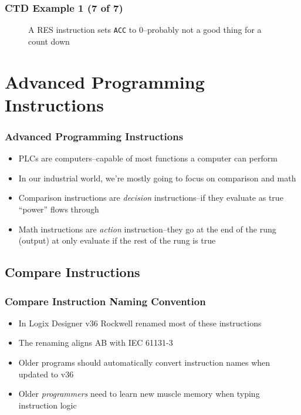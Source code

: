 \begin{frame}
    \frametitle{CTD Example 1 (7 of 7)}

    \begin{figure}
        \centering
        \resizebox{0.875\linewidth}{!}{
            
        }

        \vspace{0.5em}
        {\footnotesize A RES instruction sets \texttt{ACC} to 0--probably not a good thing for a count down\par}
    \end{figure}
\end{frame}

\section{Advanced Programming Instructions}

\begin{frame}
    \frametitle{Advanced Programming Instructions}

    \begin{itemize}
        \item PLCs are computers--capable of most functions a computer can perform
        \item In our industrial world, we're mostly going to focus on comparison and math
        \item Comparison instructions are \emph{decision} instructions--if they evaluate as true ``power'' flows through
        \item Math instructions are \emph{action} instruction--they go at the end of the rung (output) at only evaluate if the rest of the rung is true
    \end{itemize}
\end{frame}

\subsection{Compare Instructions}

\begin{frame}
    \frametitle{Compare Instruction Naming Convention}

    \begin{itemize}
        \item In Logix Designer v36 Rockwell renamed most of these instructions
        \item The renaming aligns AB with IEC 61131-3
        \item Older programs should automatically convert instruction names when updated to v36
        \item Older \emph{programmers} need to learn new muscle memory when typing instruction logic
    \end{itemize}
\end{frame}

